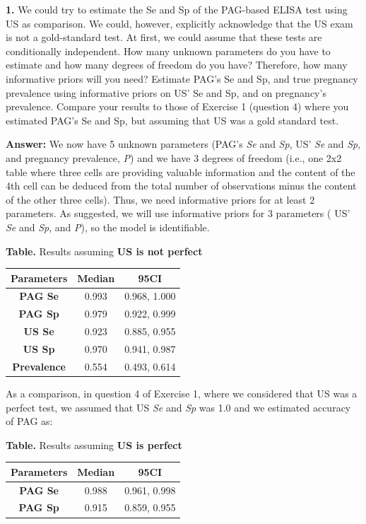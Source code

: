 \documentclass[
]{book}
\begin{document}
\textbf{1.} We could try to estimate the Se and Sp of the PAG-based ELISA test using US as comparison. We could, however, explicitly acknowledge that the US exam is not a gold-standard test. At first, we could assume that these tests are conditionally independent. How many unknown parameters do you have to estimate and how many degrees of freedom do you have? Therefore, how many informative priors will you need? Estimate PAG's Se and Sp, and true pregnancy prevalence using informative priors on US' Se and Sp, and on pregnancy's prevalence. Compare your results to those of Exercise 1 (question 4) where you estimated PAG's Se and Sp, but assuming that US was a gold standard test.

\textbf{Answer:} We now have 5 unknown parameters (PAG's \emph{Se} and \emph{Sp}, US' \emph{Se} and \emph{Sp}, and pregnancy prevalence, \emph{P}) and we have 3 degrees of freedom (i.e., one 2x2 table where three cells are providing valuable information and the content of the 4th cell can be deduced from the total number of observations minus the content of the other three cells). Thus, we need informative priors for at least 2 parameters. As suggested, we will use informative priors for 3 parameters ( US' \emph{Se} and \emph{Sp}, and \emph{P}), so the model is identifiable.

\textbf{Table.} Results assuming \textbf{US is not perfect}

\begin{longtable}[]{@{}ccc@{}}
\toprule\noalign{}
\textbf{Parameters} & \textbf{Median} & \textbf{95CI} \\
\midrule\noalign{}
\endhead
\bottomrule\noalign{}
\endlastfoot
\textbf{PAG Se} & 0.993 & 0.968, 1.000 \\
\textbf{PAG Sp} & 0.979 & 0.922, 0.999 \\
\textbf{US Se} & 0.923 & 0.885, 0.955 \\
\textbf{US Sp} & 0.970 & 0.941, 0.987 \\
\textbf{Prevalence} & 0.554 & 0.493, 0.614 \\
\end{longtable}

As a comparison, in question 4 of Exercise 1, where we considered that US was a perfect test, we assumed that US \emph{Se} and \emph{Sp} was 1.0 and we estimated accuracy of PAG as:

\textbf{Table.} Results assuming \textbf{US is perfect}

\begin{longtable}[]{@{}ccc@{}}
\toprule\noalign{}
\textbf{Parameters} & \textbf{Median} & \textbf{95CI} \\
\midrule\noalign{}
\endhead
\bottomrule\noalign{}
\endlastfoot
\textbf{PAG Se} & 0.988 & 0.961, 0.998 \\
\textbf{PAG Sp} & 0.915 & 0.859, 0.955 \\
\end{longtable}
\end{document}
